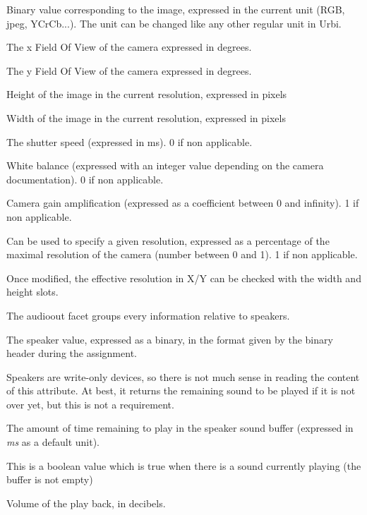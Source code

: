 \begin{slots}
  {%
    Binary value corresponding to the image, expressed in the current
    unit (RGB, jpeg, YCrCb...). The unit can be changed like any other
    regular unit in Urbi. %
  }

  {%
    The x Field Of View of the camera expressed in degrees.%
  }

  {%
    The y Field Of View of the camera expressed in degrees.%
  }

  {%
    Height of the image in the current resolution, expressed in
    pixels%
  }

  {%
    Width of the image in the current resolution, expressed in pixels%
  }

  {%
    The shutter speed (expressed in ms). 0 if non applicable.%
  }

  {%
    White balance (expressed with an integer value depending on the
    camera documentation). 0 if non applicable.%
  }

  {%
    Camera gain amplification (expressed as a coefficient between 0
    and infinity). 1 if non applicable.%
  }

  {%
    Can be used to specify a given resolution, expressed as a
    percentage of the maximal resolution of the camera (number between
    0 and 1). 1 if non applicable.

    Once modified, the effective resolution in X/Y can be checked with
    the width and height slots.%
  }

\end{slots}

The audioout facet groups every information relative to speakers.

\begin{slots}
  {%
    The speaker value, expressed as a binary, in the format given by
    the binary header during the assignment.

    Speakers are write-only devices, so there is not much sense in
    reading the content of this attribute. At best, it returns the
    remaining sound to be played if it is not over yet, but this is
    not a requirement.%
  }

  {%
    The amount of time remaining to play in the speaker sound buffer
    (expressed in \textit{ms} as a default unit).%
  }

  {%
    This is a boolean value which is true when there is a sound
    currently playing (the buffer is not empty)%
  }

  {%
    Volume of the play back, in decibels.%
  }
\end{slots}



